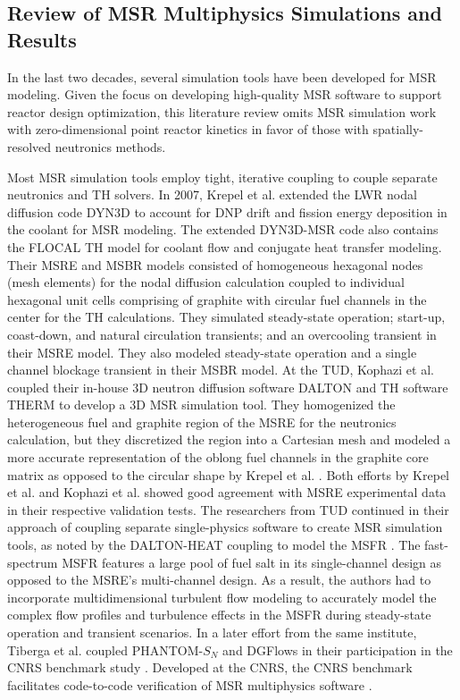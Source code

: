 \subsection{Review of MSR Multiphysics Simulations and Results} \label{sec:msr-tools}

In the last two decades, several simulation tools have been developed for \gls{MSR} modeling. Given
the focus on developing high-quality \gls{MSR} software to support reactor design optimization,
this literature review omits MSR simulation work with zero-dimensional point reactor kinetics in
favor of those with spatially-resolved neutronics methods.

Most \gls{MSR} simulation tools employ tight, iterative coupling to couple separate neutronics and
\gls{TH} solvers. In 2007, Krepel et al. \cite{krepel_dyn3d-msr_2007} extended the
\gls{LWR} nodal diffusion code DYN3D to account for \gls{DNP} drift and fission energy deposition
in the coolant for \gls{MSR} modeling. The extended DYN3D-MSR code also contains the FLOCAL
\gls{TH} model for coolant flow and conjugate heat transfer modeling. Their \gls{MSRE} and
\gls{MSBR} models consisted of homogeneous hexagonal nodes (mesh elements) for the nodal diffusion
calculation coupled to individual hexagonal unit cells comprising of graphite with circular fuel
channels in the center for the \gls{TH} calculations. They simulated steady-state operation;
start-up, coast-down, and natural circulation transients; and an overcooling transient in their
\gls{MSRE} model. They also modeled steady-state operation and a single channel blockage transient
in their \gls{MSBR} model. At the \gls{TUD}, Kophazi et al. \cite{kophazi_development_2009} coupled
their in-house 3D neutron diffusion software DALTON \cite{boer_validation_2010} and \gls{TH}
software THERM to develop a 3D \gls{MSR} simulation tool. They homogenized the heterogeneous fuel
and graphite region of the \gls{MSRE} for the neutronics calculation, but they discretized the
region into a Cartesian mesh and modeled a more accurate representation of the oblong fuel channels
in the graphite core matrix as opposed to the circular shape by Krepel et al.
\cite{krepel_dyn3d-msr_2007}. Both efforts by Krepel et al. and Kophazi et al. showed good
agreement with \gls{MSRE} experimental data in their respective validation tests.
The researchers from \gls{TUD} continued in their approach of coupling separate single-physics
software to create \gls{MSR} simulation tools, as noted by the DALTON-HEAT
\cite{de_zwaan_static_2007} coupling to model the \gls{MSFR} \cite{fiorina_modelling_2014}. The
fast-spectrum \gls{MSFR} features a large pool of fuel salt in its single-channel design as opposed
to the \gls{MSRE}'s multi-channel design. As a result, the authors had to incorporate
multidimensional turbulent flow modeling to accurately model the complex flow profiles and
turbulence effects in the \gls{MSFR} during steady-state operation and transient scenarios. In a
later effort from the same institute, Tiberga et al. \cite{tiberga_discontinuous_2019} coupled
PHANTOM-$S_N$ and DGFlows in their participation in the CNRS benchmark study
\cite{tiberga_results_2020}. Developed at the \gls{CNRS}, the CNRS benchmark facilitates
code-to-code verification of \gls{MSR} multiphysics software \cite{aufiero_testing_2018}.

